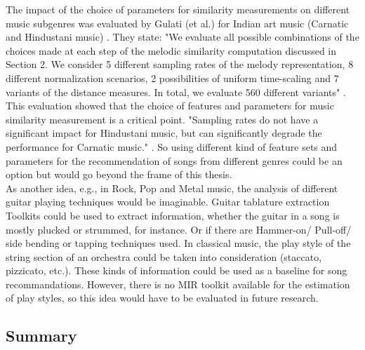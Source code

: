 The impact of the choice of parameters for similarity measurements on different music subgenres was evaluated by Gulati (et al.) for Indian art music (Carnatic and Hindustani music) \cite{mussim1}. They state: "We evaluate all possible combinations of the choices made at each step of the melodic similarity computation discussed in Section 2.  We consider 5 different sampling rates of the melody representation, 8 different normalization scenarios, 2 possibilities of uniform time-scaling and 7 variants of the distance measures.  In total, we evaluate 560 different variants" \cite[p. 3]{mussim1}. This evaluation showed that the choice of features and parameters for music similarity measurement is a critical point. "Sampling rates do not have a significant impact for Hindustani music, but can significantly degrade the performance for Carnatic music." \cite[p. 3]{mussim1}. So using different kind of feature sets and parameters for the recommendation of songs from different genres could be an option but would go beyond the frame of this thesis.\\
As another idea, e.g., in Rock, Pop and Metal music, the analysis of different guitar playing techniques would be imaginable. Guitar tablature extraction \cite{guitext1} Toolkits could be used to extract information, whether the guitar in a song is mostly plucked or strummed, for instance. Or if there are Hammer-on/ Pull-off/ side bending or tapping techniques used. In classical music, the play style of the string section of an orchestra could be taken into consideration (staccato, pizzicato, etc.). These kinds of information could be used as a baseline for song recommandations. 
However, there is no MIR toolkit available for the estimation of play styles, so this idea would have to be evaluated in future research.

\subsection{Summary}

